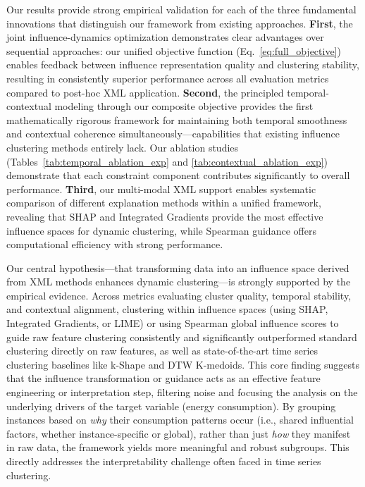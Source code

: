 \documentclass[final,authoryear,3p,times,review,sort&compress]{elsarticle}
\begin{document}
Our results provide strong empirical validation for each of the three fundamental innovations that distinguish our framework from existing approaches. \textbf{First}, the joint influence-dynamics optimization demonstrates clear advantages over sequential approaches: our unified objective function (Eq.~\ref{eq:full_objective}) enables feedback between influence representation quality and clustering stability, resulting in consistently superior performance across all evaluation metrics compared to post-hoc XML application. \textbf{Second}, the principled temporal-contextual modeling through our composite objective provides the first mathematically rigorous framework for maintaining both temporal smoothness and contextual coherence simultaneously—capabilities that existing influence clustering methods entirely lack. Our ablation studies (Tables~\ref{tab:temporal_ablation_exp} and \ref{tab:contextual_ablation_exp}) demonstrate that each constraint component contributes significantly to overall performance. \textbf{Third}, our multi-modal XML support enables systematic comparison of different explanation methods within a unified framework, revealing that SHAP and Integrated Gradients provide the most effective influence spaces for dynamic clustering, while Spearman guidance offers computational efficiency with strong performance.

Our central hypothesis—that transforming data into an influence space derived from XML methods enhances dynamic clustering—is strongly supported by the empirical evidence. Across metrics evaluating cluster quality, temporal stability, and contextual alignment, clustering within influence spaces (using SHAP, Integrated Gradients, or LIME) or using Spearman global influence scores to guide raw feature clustering consistently and significantly outperformed standard clustering directly on raw features, as well as state-of-the-art time series clustering baselines like k-Shape and DTW K-medoids. This core finding suggests that the influence transformation or guidance acts as an effective feature engineering or interpretation step, filtering noise and focusing the analysis on the underlying drivers of the target variable (energy consumption). By grouping instances based on \textit{why} their consumption patterns occur (i.e., shared influential factors, whether instance-specific or global), rather than just \textit{how} they manifest in raw data, the framework yields more meaningful and robust subgroups. This directly addresses the interpretability challenge often faced in time series clustering.
\end{document}
